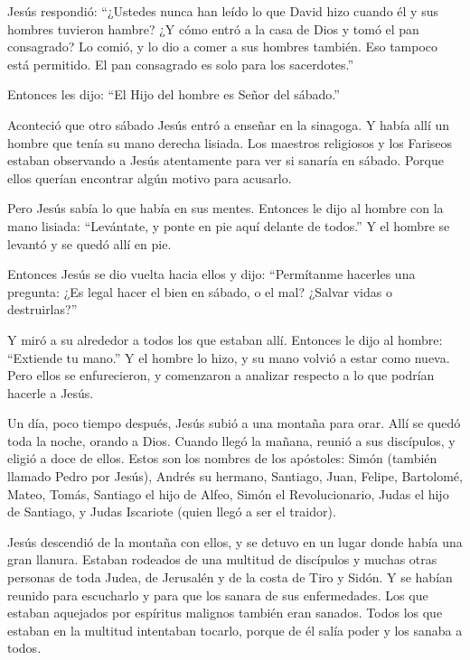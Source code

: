  Jesús respondió: ``¿Ustedes nunca han leído lo que David
hizo cuando él y sus hombres tuvieron hambre?  ¿Y cómo entró
a la casa de Dios y tomó el pan consagrado? Lo comió, y lo dio a comer a
sus hombres también. Eso tampoco está permitido. El pan consagrado es
solo para los sacerdotes.''

 Entonces les dijo: ``El Hijo del hombre es Señor del
sábado.''

 Aconteció que otro sábado Jesús entró a enseñar en la
sinagoga. Y había allí un hombre que tenía su mano derecha lisiada.
 Los maestros religiosos y los Fariseos estaban observando a
Jesús atentamente para ver si sanaría en sábado. Porque ellos querían
encontrar algún motivo para acusarlo.

 Pero Jesús sabía lo que había en sus mentes. Entonces le
dijo al hombre con la mano lisiada: ``Levántate, y ponte en pie aquí
delante de todos.'' Y el hombre se levantó y se quedó allí en pie.

 Entonces Jesús se dio vuelta hacia ellos y dijo:
``Permítanme hacerles una pregunta: ¿Es legal hacer el bien en sábado, o
el mal? ¿Salvar vidas o destruirlas?''

 Y miró a su alrededor a todos los que estaban allí.
Entonces le dijo al hombre: ``Extiende tu mano.'' Y el hombre lo hizo, y
su mano volvió a estar como nueva.  Pero ellos se
enfurecieron, y comenzaron a analizar respecto a lo que podrían hacerle
a Jesús.

 Un día, poco tiempo después, Jesús subió a una montaña
para orar. Allí se quedó toda la noche, orando a Dios. 
Cuando llegó la mañana, reunió a sus discípulos, y eligió a doce de
ellos. Estos son los nombres de los apóstoles:  Simón
(también llamado Pedro por Jesús), Andrés su hermano, Santiago, Juan,
Felipe, Bartolomé,  Mateo, Tomás, Santiago el hijo de
Alfeo, Simón el Revolucionario,  Judas el hijo de Santiago,
y Judas Iscariote (quien llegó a ser el traidor).

 Jesús descendió de la montaña con ellos, y se detuvo en un
lugar donde había una gran llanura. Estaban rodeados de una multitud de
discípulos y muchas otras personas de toda Judea, de Jerusalén y de la
costa de Tiro y Sidón. Y se habían reunido para escucharlo y para que
los sanara de sus enfermedades.  Los que estaban aquejados
por espíritus malignos también eran sanados.  Todos los que
estaban en la multitud intentaban tocarlo, porque de él salía poder y
los sanaba a todos.

